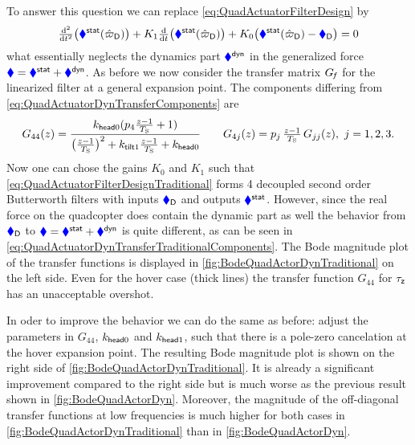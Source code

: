 To answer this question we can replace \eqref{eq:QuadActuatorFilterDesign} by
\begin{align}\label{eq:QuadActuatorFilterDesignTraditional}
 \tfrac{\mathrm{d}^2}{\mathrm{d} t^2} \big(\textcolor{blue}{\blacklozenge}^{\mathsf{stat}}(\hat{\varpi}_{\mathsf{D}})\big) + K_1 \tfrac{\mathrm{d}}{\mathrm{d} t} \big(\textcolor{blue}{\blacklozenge}^{\mathsf{stat}}(\hat{\varpi}_{\mathsf{D}})\big) + K_0 \big( \textcolor{blue}{\blacklozenge}^{\mathsf{stat}}(\hat{\varpi}_{\mathsf{D}}) - \textcolor{blue}{\blacklozenge}_{\mathsf{D}} \big) = 0
\end{align}
what essentially neglects the dynamics part $\textcolor{blue}{\blacklozenge}^{\mathsf{dyn}}$ in the generalized force $\textcolor{blue}{\blacklozenge} = \textcolor{blue}{\blacklozenge}^{\mathsf{stat}} + \textcolor{blue}{\blacklozenge}^{\mathsf{dyn}}$.
As before we now consider the transfer matrix $G_{\hspace{-0.3ex}f}$ for the linearized filter at a general expansion point.
The components differing from \eqref{eq:QuadActuatorDynTransferComponents} are
\begin{align}\label{eq:QuadActuatorDynTransferTraditionalComponents}
 G_{44}(z) = \frac{k_{\mathsf{head}0}(p_4\tfrac{z-1}{T_{\mathrm{S}}} + 1)}{\big(\tfrac{z-1}{T_{\mathrm{S}}}\big)^2 + k_{\mathsf{tilt}1} \tfrac{z-1}{T_{\mathrm{S}}} + k_{\mathsf{head}0}}
\qquad
 G_{4j}(z) = p_j\,\tfrac{z-1}{T_{\mathrm{S}}}\,G_{jj}(z), \ j=1,2,3.
\end{align}
Now one can chose the gains $K_0$ and $K_1$ such that \eqref{eq:QuadActuatorFilterDesignTraditional} forms 4 decoupled second order Butterworth filters with inputs $\textcolor{blue}{\blacklozenge}_{\mathsf{D}}$ and outputs $\textcolor{blue}{\blacklozenge}^{\mathsf{stat}}$.
However, since the real force on the quadcopter does contain the dynamic part as well the behavior from $\textcolor{blue}{\blacklozenge}_{\mathsf{D}}$ to $\textcolor{blue}{\blacklozenge} = \textcolor{blue}{\blacklozenge}^{\mathsf{stat}} + \textcolor{blue}{\blacklozenge}^{\mathsf{dyn}}$ is quite different, as can be seen in \eqref{eq:QuadActuatorDynTransferTraditionalComponents}.
The Bode magnitude plot of the transfer functions is displayed in \autoref{fig:BodeQuadActorDynTraditional} on the left side.
Even for the hover case (thick lines) the transfer function $G_{44}$ for $\tau_{\mathsf{z}}$ has an unacceptable overshot.

In oder to improve the behavior we can do the same as before: adjust the parameters in $G_{44}$, \ie $k_{\mathsf{head}0}$ and $k_{\mathsf{head}1}$, such that there is a pole-zero cancelation at the hover expansion point.
The resulting Bode magnitude plot is shown on the right side of \autoref{fig:BodeQuadActorDynTraditional}.
It is already a significant improvement compared to the right side but is much worse as the previous result shown in \autoref{fig:BodeQuadActorDyn}.
Moreover, the magnitude of the off-diagonal transfer functions at low frequencies is much higher for both cases in \autoref{fig:BodeQuadActorDynTraditional} than in \autoref{fig:BodeQuadActorDyn}.


